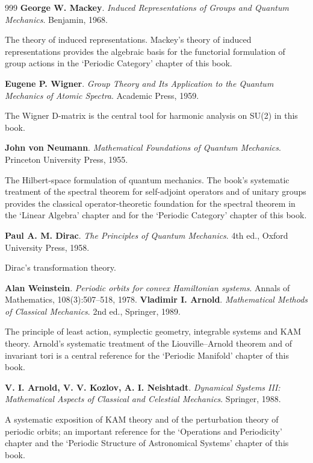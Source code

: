 \begin{thebibliography}{999}
 \textbf{George W. Mackey}. \textit{Induced Representations of Groups and Quantum Mechanics}. Benjamin, 1968.

The theory of induced representations. Mackey's theory of induced representations provides the algebraic basis for the functorial formulation of group actions in the `Periodic Category' chapter of this book.

 \textbf{Eugene P. Wigner}. \textit{Group Theory and Its Application to the Quantum Mechanics of Atomic Spectra}. Academic Press, 1959.

The Wigner D-matrix is the central tool for harmonic analysis on SU(2) in this book.

 \textbf{John von Neumann}. \textit{Mathematical Foundations of Quantum Mechanics}. Princeton University Press, 1955.

The Hilbert-space formulation of quantum mechanics. The book's systematic treatment of the spectral theorem for self-adjoint operators and of unitary groups provides the classical operator-theoretic foundation for the spectral theorem in the `Linear Algebra' chapter and for the `Periodic Category' chapter of this book.

 \textbf{Paul A. M. Dirac}. \textit{The Principles of Quantum Mechanics}. 4th ed., Oxford University Press, 1958.

Dirac's transformation theory.

 \textbf{Alan Weinstein}. \textit{Periodic orbits for convex Hamiltonian systems}. Annals of Mathematics, 108(3):507--518, 1978.
 \textbf{Vladimir I. Arnold}. \textit{Mathematical Methods of Classical Mechanics}. 2nd ed., Springer, 1989.

The principle of least action, symplectic geometry, integrable systems and KAM theory. Arnold's systematic treatment of the Liouville--Arnold theorem and of invariant tori is a central reference for the `Periodic Manifold' chapter of this book.

 \textbf{V. I. Arnold, V. V. Kozlov, A. I. Neishtadt}. \textit{Dynamical Systems III: Mathematical Aspects of Classical and Celestial Mechanics}. Springer, 1988.

A systematic exposition of KAM theory and of the perturbation theory of periodic orbits; an important reference for the `Operations and Periodicity' chapter and the `Periodic Structure of Astronomical Systems' chapter of this book.


\end{thebibliography}
